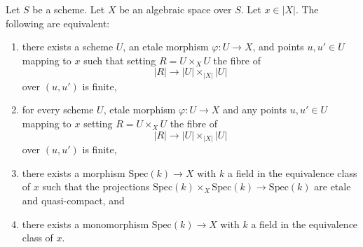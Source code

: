 \begin{lemma}
\label{lemma-R-finite-above-x}
Let $S$ be a scheme. Let $X$ be an algebraic space over $S$.
Let $x \in |X|$. The following are equivalent:
\begin{enumerate}
\item there exists a scheme $U$, an etale morphism
$\varphi : U \to X$, and points $u, u' \in U$ mapping to
$x$ such that setting $R = U \times_X U$ the fibre of
$$
|R| \to |U| \times_{|X|} |U|
$$
over $(u, u')$ is finite,
\item for every scheme $U$, etale morphism $\varphi : U \to X$ and
any points $u, u' \in U$ mapping to
$x$ setting $R = U \times_X U$ the fibre of
$$
|R| \to |U| \times_{|X|} |U|
$$
over $(u, u')$ is finite,
\item there exists a morphism $\text{Spec}(k) \to X$ with $k$ a field
in the equivalence class of $x$ such that the projections
$\text{Spec}(k) \times_X \text{Spec}(k) \to \text{Spec}(k)$ are
etale and quasi-compact, and
\item there exists a monomorphism $\text{Spec}(k) \to X$ with $k$ a field
in the equivalence class of $x$.
\end{enumerate}
\end{lemma}

